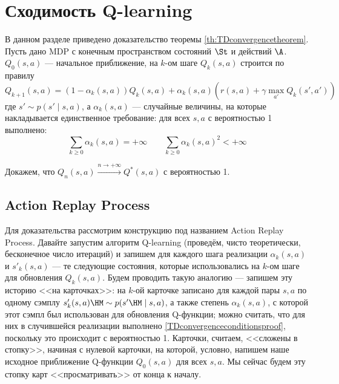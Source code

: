 \section{Сходимость Q-learning}\label{appendix:qlearning}

В данном разделе приведено доказательство теоремы \ref{th:TDconvergencetheorem}. Пусть дано MDP с конечным пространством состояний $\St$ и действий $\A$. $Q_0(s, a)$ --- начальное приближение, на $k$-ом шаге $Q_k(s, a)$ строится по правилу
\begin{equation}\label{Qlearningupdateproof}
Q_{k+1}(s, a) = (1 - \alpha_k(s, a))Q_k(s, a) + \alpha_k(s, a) \left( r(s, a) + \gamma \max_{a'} Q_k(s', a')\right)
\end{equation}
где $s' \sim p(s' \mid s, a)$, а $\alpha_k(s, a)$ --- случайные величины, на которые накладывается единственное требование: для всех $s, a$ с вероятностью 1 выполнено:
\begin{equation}\label{TDconvergenceconditionsproof}
\sum_{k \ge 0} \alpha_k(s, a) = +\infty \qquad \sum_{k \ge 0} \alpha_k(s, a)^2 < +\infty
\end{equation}

Докажем, что $Q_n(s, a) \xrightarrow{ n \to +\infty } Q^*(s, a)$ с вероятностью 1.

\subsection{Action Replay Process}

Для доказательства рассмотрим конструкцию под названием Action Replay Process. Давайте запустим алгоритм Q-learning (проведём, чисто теоретически, бесконечное число итераций) и запишем для каждого шага реализации $\alpha_k(s, a)$ и $s'_k(s, a)$ --- те следующие состояния, которые использовались на $k$-ом шаге для обновления $Q_k(s, a)$. Будем проводить такую аналогию --- запишем эту историю <<на карточках>>: на $k$-ой карточке записано для каждой пары $s, a$ по одному сэмплу $s'_k(s, a) \HM\sim p(s' \HM\mid s, a)$, а также степень $\alpha_k(s, a)$, с которой этот сэмпл был использован для обновления Q-функции; можно считать, что для них в случившейся реализации выполнено \eqref{TDconvergenceconditionsproof}, поскольку это происходит с вероятностью 1. Карточки, считаем, <<сложены в стопку>>, начиная с нулевой карточки, на которой, условно, напишем наше исходное приближение Q-функции $Q_0(s, a)$ для всех $s, a$. Мы сейчас будем эту стопку карт <<просматривать>> от конца к началу.

